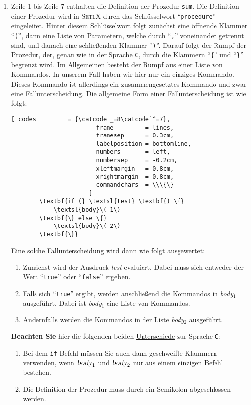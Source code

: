 \begin{enumerate}
\item Zeile 1 bis Zeile 7 enthalten die Definition der Prozedur \texttt{sum}.  Die 
      Definition einer Prozedur wird in \textsc{SetlX} durch das Schlüsselwort
      ``\texttt{procedure}'' eingeleitet.  Hinter diesem Schlüsselwort 
      folgt zunächst eine öffnende Klammer ``\texttt{(}'', dann
      eine Liste von Parametern, welche durch ``\texttt{,}'' voneinander getrennt sind, 
      und danach  eine schließenden Klammer ``\texttt{)}''.
      Darauf folgt der Rumpf der Prozedur, der, genau wie in der Sprache \texttt{C},
      durch die Klammern ``\texttt{\{}'' und
      ``\texttt{\}}'' begrenzt wird.  Im Allgemeinen besteht der Rumpf aus einer
      Liste von Kommandos.  In unserem Fall haben wir hier nur ein einziges Kommando.
      Dieses Kommando ist allerdings ein zusammengesetztes Kommando und zwar eine
      Fallunterscheidung.  Die allgemeine Form einer Fallunterscheidung ist wie folgt:

      \begin{Verbatim}[ codes         = {\catcode`_=8\catcode`^=7},
                        frame         = lines, 
                        framesep      = 0.3cm, 
                        labelposition = bottomline,
                        numbers       = left,
                        numbersep     = -0.2cm,
                        xleftmargin   = 0.8cm,
                        xrightmargin  = 0.8cm,
                        commandchars  = \\\{\}
                      ]
        \textbf{if (} \textsl{test} \textbf{) \{}
            \textsl{body}\(_1\)
        \textbf{\} else \{}
            \textsl{body}\(_2\)
        \textbf{\}}
      \end{Verbatim}
      \vspace*{-0.1cm}
      Eine solche  Fallunterscheidung wird dann wie folgt ausgewertet:
      \begin{enumerate}
      \item Zunächst wird der Ausdruck \textsl{test} evaluiert.  Dabei
            muss sich entweder der Wert ``\texttt{true}'' oder ``\texttt{false}'' ergeben.
      \item Falls sich ``\texttt{true}'' ergibt, werden anschließend die Kommandos
            in  \textsl{body}$_1$ ausgeführt.  Dabei ist \textsl{body}$_1$ 
            eine Liste von Kommandos.
      \item Andernfalls werden die Kommandos in der Liste \textsl{body}$_2$ ausgeführt.
      \end{enumerate}
      \textbf{Beachten Sie} hier die folgenden beiden \underline{Unterschiede} zur Sprache \texttt{C}:
      \begin{enumerate}
      \item Bei dem \texttt{if}-Befehl müssen Sie auch dann geschweifte Klammern
            verwenden, wenn $\textsl{body}_1$ und $\textsl{body}_2$ nur aus einem einzigen
            Befehl bestehen.  
      \item Die Definition der Prozedur muss durch ein Semikolon abgeschlossen werden.
      \end{enumerate}
      

\end{enumerate}
